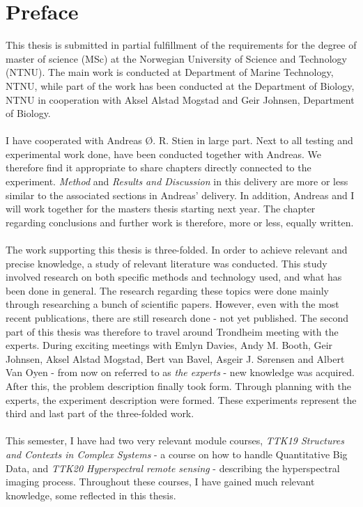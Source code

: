 \hypersetup{pageanchor=true}
%
\chapter*{Preface}
This thesis is submitted in partial fulfillment of the requirements for the degree of master of science (MSc) at the Norwegian University of Science and Technology (NTNU). The main work is conducted at Department of Marine Technology, NTNU, while part of the work has been conducted at the Department of Biology, NTNU in cooperation with Aksel Alstad Mogstad and Geir Johnsen, Department of Biology. 
\\\\
I have cooperated with Andreas {\O}. R. Stien in large part. Next to all testing and experimental work done, have been conducted together with Andreas. We therefore find it appropriate to share chapters directly connected to the experiment. \textit{Method} and \textit{Results and Discussion} in this delivery are more or less similar to the associated sections in Andreas’ delivery. In addition, Andreas and I will work together for the masters thesis starting next year. The chapter regarding conclusions and further work is therefore, more or less, equally written. 
\\\\
The work supporting this thesis is three-folded. In order to achieve relevant and precise knowledge, a study of relevant literature was conducted. This study involved research on both specific methods and technology used, and what has been done in general. The research regarding these topics were done mainly through researching a bunch of scientific papers. However, even with the most recent publications, there are still research done - not yet published. The second part of this thesis was therefore to travel around Trondheim meeting with the experts. During exciting meetings with Emlyn Davies, Andy M. Booth, Geir Johnsen, Aksel Alstad Mogstad, Bert van Bavel, Asgeir J. S{\o}rensen and Albert Van Oyen - from now on referred to as \textit{the experts} - new knowledge was acquired. After this, the problem description finally took form. Through planning with the experts, the experiment description were formed. These experiments represent the third and last part of the three-folded work. 
\\\\
This semester, I have had two very relevant module courses, \textit{TTK19 Structures and Contexts in Complex Systems} -  a course on how to handle Quantitative Big Data, and \textit{TTK20 Hyperspectral remote sensing} - describing the hyperspectral imaging process. Throughout these courses, I have gained much relevant knowledge, some reflected in this thesis.


